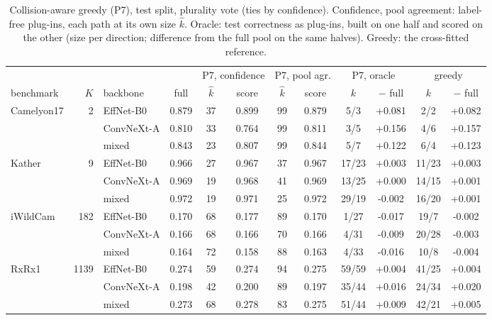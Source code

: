\begin{table}[t]
\centering
\footnotesize
\caption{Collision-aware greedy (P7), test split, plurality vote (ties by confidence). Confidence, pool agreement: label-free plug-ins, each path at its own size $\hat k$. Oracle: test correctness as plug-ins, built on one half and scored on the other (size per direction; difference from the full pool on the same halves). Greedy: the cross-fitted reference.}
\label{tab:marginal}
\setlength{\tabcolsep}{2.5pt}\begin{adjustbox}{max width=\linewidth}
\begin{tabular}{lrlccccccccc}
\toprule
& & & & \multicolumn{2}{c}{P7, confidence} & \multicolumn{2}{c}{P7, pool agr.} & \multicolumn{2}{c}{P7, oracle} & \multicolumn{2}{c}{greedy} \\ \cmidrule(lr){5-6}\cmidrule(lr){7-8}\cmidrule(lr){9-10}\cmidrule(lr){11-12} benchmark & $K$ & backbone & full & $\hat k$ & score & $\hat k$ & score & $k$ & $-$ full & $k$ & $-$ full \\
\midrule
Camelyon17 & 2 & EffNet-B0 & 0.879 & 37 & 0.899 & 99 & 0.879 & 5/3 & +0.081 & 2/2 & +0.082 \\
 &  & ConvNeXt-A & 0.810 & 33 & 0.764 & 99 & 0.811 & 3/5 & +0.156 & 4/6 & +0.157 \\
 &  & mixed & 0.843 & 23 & 0.807 & 99 & 0.844 & 5/7 & +0.122 & 6/4 & +0.123 \\
\addlinespace
Kather & 9 & EffNet-B0 & 0.966 & 27 & 0.967 & 37 & 0.967 & 17/23 & +0.003 & 11/23 & +0.003 \\
 &  & ConvNeXt-A & 0.969 & 19 & 0.968 & 41 & 0.969 & 13/25 & +0.000 & 14/15 & +0.001 \\
 &  & mixed & 0.972 & 19 & 0.971 & 25 & 0.972 & 29/19 & -0.002 & 16/20 & +0.001 \\
\addlinespace
iWildCam & 182 & EffNet-B0 & 0.170 & 68 & 0.177 & 89 & 0.170 & 1/27 & -0.017 & 19/7 & -0.002 \\
 &  & ConvNeXt-A & 0.166 & 68 & 0.166 & 70 & 0.166 & 4/31 & -0.009 & 20/28 & -0.003 \\
 &  & mixed & 0.164 & 72 & 0.158 & 88 & 0.163 & 4/33 & -0.016 & 10/8 & -0.004 \\
\addlinespace
RxRx1 & 1139 & EffNet-B0 & 0.274 & 59 & 0.274 & 94 & 0.275 & 59/59 & +0.004 & 41/25 & +0.004 \\
 &  & ConvNeXt-A & 0.198 & 42 & 0.200 & 89 & 0.197 & 35/44 & +0.016 & 24/34 & +0.020 \\
 &  & mixed & 0.273 & 68 & 0.278 & 83 & 0.275 & 51/44 & +0.009 & 42/21 & +0.005 \\
\bottomrule
\end{tabular}
\end{adjustbox}
\end{table}
